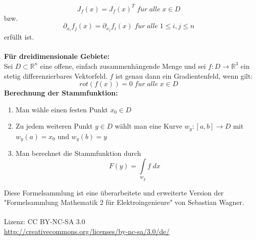 \documentclass[a4paper,twocolumn,10pt]{article}
\begin{document}
\begin{equation*}
J_f(x)=J_f(x)^T\;f\ddot{u}r\;alle\;x\in D
\end{equation*}
bzw.
\begin{equation*}
\partial_{x_i}f_j(x)=\partial_{x_j}f_i(x)\;f\ddot{u}r\;alle\;1\leq i,j\leq n
\end{equation*}
erfüllt ist.\\\\
\textbf{Für dreidimensionale Gebiete:}\\
Sei $D\subset\mathbb{R}^n$ eine offene, einfach zusammenhängende Menge und sei $f:D\rightarrow\mathbb{R}^3$ ein stetig differenzierbares Vektorfeld. $f$ ist genau dann ein Gradientenfeld, wenn gilt:
\begin{equation*}
rot(f(x))=0\;f\ddot{u}r\;alle\;x\in D
\end{equation*}
\textbf{Berechnung der Stammfunktion:}
\begin{enumerate}
\item Man wähle einen festen Punkt $x_0\in D$
\item Zu jedem weiteren Punkt $y\in D$ wählt man eine Kurve $w_y:[a,b]\rightarrow D$ mit $w_y(a)=x_0$ und $w_y(b)=y$
\item Man berechnet die Stammfunktion durch
\begin{equation*}
F(y)=\int\limits_{w_y}f\;dx
\end{equation*}
\end{enumerate}
\vspace{1cm}
Diese Formelsammlung ist eine überarbeitete und erweiterte Version der "Formelsammlung Mathematik 2 für Elektroingenieure" von Sebastian Wagner.\\\\
Lizenz: CC BY-NC-SA 3.0\\
\url{http://creativecommons.org/licenses/by-nc-sa/3.0/de/}
\end{document}
